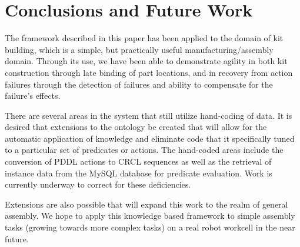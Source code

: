 \section{Conclusions and Future Work}
\label{sect:future}
The framework described in this paper has been applied to the domain of kit building, which is a simple, but practically useful manufacturing/assembly domain. Through its use, we have been able to demonstrate agility in both kit construction through late binding of part locations, and in recovery from action failures through the detection of failures and ability to compensate for the failure's effects.

There are several areas in the system that still utilize hand-coding of data. It is desired that extensions to the ontology be created that will allow for the automatic application of knowledge and eliminate code that it specifically tuned to a particular set of predicates or actions. The hand-coded areas include the conversion of PDDL actions to CRCL sequences as well as the retrieval of instance data from the MySQL database for predicate evaluation. Work is currently underway to correct for these deficiencies. 

Extensions are also possible that will expand this work to the realm of general assembly. We hope to apply this knowledge based framework to simple assembly tasks (growing towards more complex tasks) on a real robot workcell in the near future. 
